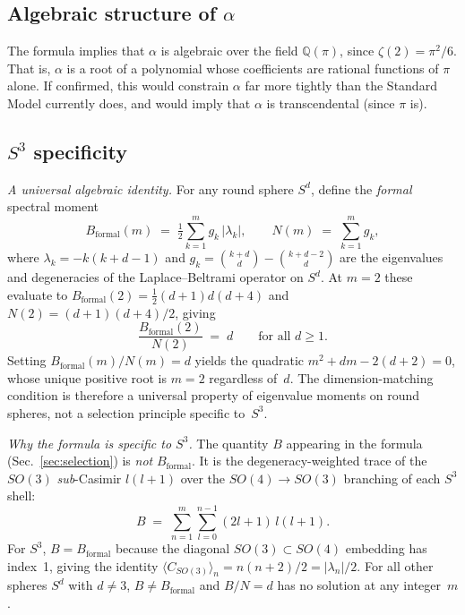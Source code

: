 \documentclass[aps,prl,twocolumn,superscriptaddress]{revtex4-2}
\begin{document}
\subsection{Algebraic structure of $\alpha$}

The formula implies that $\alpha$ is algebraic over the field
$\mathbb{Q}(\pi)$, since $\zeta(2) = \pi^2/6$. That is,
$\alpha$ is a root of a polynomial whose coefficients are rational
functions of $\pi$ alone. If confirmed, this would constrain $\alpha$
far more tightly than the Standard Model currently does, and would
imply that $\alpha$ is transcendental (since $\pi$ is).


\subsection{$S^3$ specificity}\label{sec:s3_specificity}

\textit{A universal algebraic identity.}
For any round sphere $S^d$, define the \textit{formal} spectral moment
\begin{equation}\label{eq:B_formal}
  B_{\mathrm{formal}}(m) \;=\;
  \tfrac{1}{2}\sum_{k=1}^{m} g_k\,|\lambda_k|,
  \qquad
  N(m) \;=\; \sum_{k=1}^{m} g_k,
\end{equation}
where $\lambda_k = -k(k+d-1)$ and
$g_k = \binom{k+d}{d} - \binom{k+d-2}{d}$ are the eigenvalues and
degeneracies of the Laplace--Beltrami operator on $S^d$. At $m = 2$
these evaluate to $B_{\mathrm{formal}}(2) = \tfrac{1}{2}(d+1)d(d+4)$
and $N(2) = (d+1)(d+4)/2$, giving
\begin{equation}\label{eq:universal_identity}
  \frac{B_{\mathrm{formal}}(2)}{N(2)} \;=\; d
  \qquad\text{for all } d \geq 1.
\end{equation}
Setting $B_{\mathrm{formal}}(m)/N(m) = d$ yields the quadratic
$m^2 + dm - 2(d+2) = 0$, whose unique positive root is $m = 2$
regardless of~$d$. The dimension-matching condition is therefore a
universal property of eigenvalue moments on round spheres, not a
selection principle specific to~$S^3$.

\textit{Why the formula is specific to $S^3$.}
The quantity $B$ appearing in the formula (Sec.~\ref{sec:selection})
is \textit{not} $B_{\mathrm{formal}}$. It is the
degeneracy-weighted trace of the $SO(3)$ \textit{sub}-Casimir
$l(l+1)$ over the $SO(4) \to SO(3)$ branching of each $S^3$ shell:
\begin{equation}\label{eq:B_branch}
  B \;=\; \sum_{n=1}^{m}\sum_{l=0}^{n-1}(2l+1)\,l(l+1).
\end{equation}
For $S^3$, $B = B_{\mathrm{formal}}$ because the diagonal
$SO(3) \subset SO(4)$ embedding has index~1, giving the identity
$\langle C_{SO(3)}\rangle_n = n(n+2)/2 = |\lambda_n|/2$. For all
other spheres $S^d$ with $d \neq 3$, $B \neq B_{\mathrm{formal}}$
and $B/N = d$ has no solution at any integer~$m$.
\end{document}
